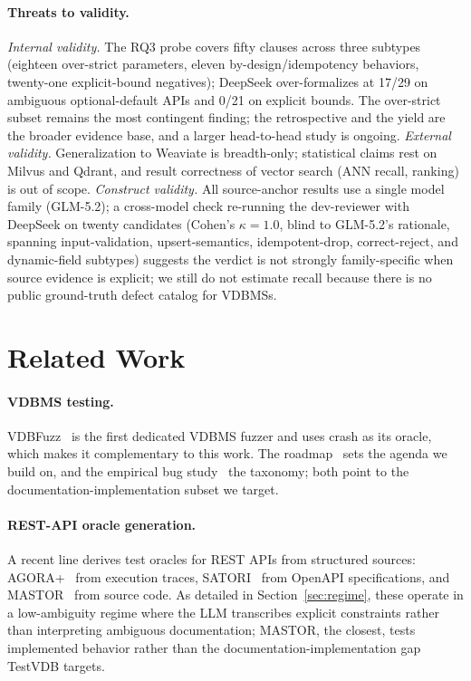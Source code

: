 \documentclass[sigconf]{acmart}
\begin{document}
\paragraph{Threats to validity.}
\emph{Internal validity.} The RQ3 probe covers fifty clauses across three subtypes (eighteen over-strict parameters, eleven by-design/idempotency behaviors, twenty-one explicit-bound negatives); DeepSeek over-formalizes at 17/29 on ambiguous optional-default APIs and 0/21 on explicit bounds. The over-strict subset remains the most contingent finding; the retrospective and the yield are the broader evidence base, and a larger head-to-head study is ongoing. \emph{External validity.} Generalization to Weaviate is breadth-only; statistical claims rest on Milvus and Qdrant, and result correctness of vector search (ANN recall, ranking) is out of scope. \emph{Construct validity.} All source-anchor results use a single model family (GLM-5.2); a cross-model check re-running the dev-reviewer with DeepSeek on twenty candidates (Cohen's $\kappa = 1.0$, blind to GLM-5.2's rationale, spanning input-validation, upsert-semantics, idempotent-drop, correct-reject, and dynamic-field subtypes) suggests the verdict is not strongly family-specific when source evidence is explicit; we still do not estimate recall because there is no public ground-truth defect catalog for VDBMSs.

\section{Related Work} \label{sec:related}

\paragraph{VDBMS testing.} VDBFuzz~\cite{vdbfuzz26} is the first dedicated VDBMS fuzzer and uses crash as its oracle, which makes it complementary to this work. The roadmap~\cite{roadmap25} sets the agenda we build on, and the empirical bug study~\cite{bugstudy25} the taxonomy; both point to the documentation-implementation subset we target.

\paragraph{REST-API oracle generation.} A recent line derives test oracles for REST APIs from structured sources: AGORA+~\cite{agoraplus25} from execution traces, SATORI~\cite{satori25} from OpenAPI specifications, and MASTOR~\cite{mastor26} from source code. As detailed in Section~\ref{sec:regime}, these operate in a low-ambiguity regime where the LLM transcribes explicit constraints rather than interpreting ambiguous documentation; MASTOR, the closest, tests implemented behavior rather than the documentation-implementation gap TestVDB targets.
\end{document}
